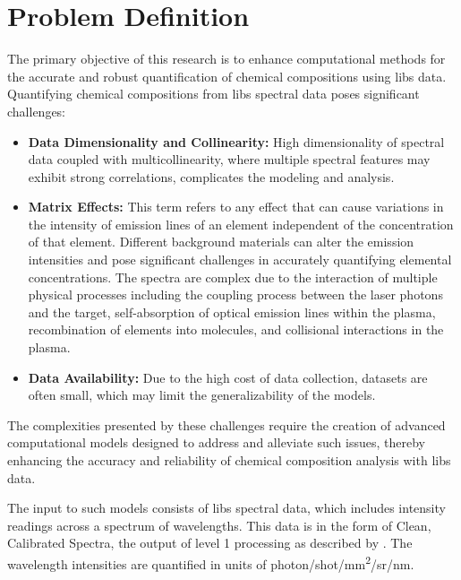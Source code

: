 \section{Problem Definition}\label{sec:problem_definition}
The primary objective of this research is to enhance computational methods for the accurate and robust quantification of chemical compositions using \gls{libs} data.
Quantifying chemical compositions from \gls{libs} spectral data poses significant challenges:
\begin{itemize}
    \item \textbf{Data Dimensionality and Collinearity:} High dimensionality of spectral data coupled with multicollinearity, where multiple spectral features may exhibit strong correlations, complicates the modeling and analysis\cite{andersonImprovedAccuracyQuantitative2017}.
    \item \textbf{Matrix Effects:} This term refers to any effect that can cause variations in the intensity of emission lines of an element independent of the concentration of that element. Different background materials can alter the emission intensities and pose significant challenges in accurately quantifying elemental concentrations. The spectra are complex due to the interaction of multiple physical processes including the coupling process between the laser photons and the target, self-absorption of optical emission lines within the plasma, recombination of elements into molecules, and collisional interactions in the plasma\cite{cleggRecalibrationMarsScience2017, andersonImprovedAccuracyQuantitative2017}.
    \item \textbf{Data Availability:} Due to the high cost of data collection, datasets are often small, which may limit the generalizability of the models\cite{p9_paper}.
\end{itemize}

The complexities presented by these challenges require the creation of advanced computational models designed to address and alleviate such issues, thereby enhancing the accuracy and reliability of chemical composition analysis with \gls{libs} data.

The input to such models consists of \gls{libs} spectral data, which includes intensity readings across a spectrum of wavelengths.
This data is in the form of Clean, Calibrated Spectra\cite{andersonImprovedAccuracyQuantitative2017}, the output of level 1 processing as described by \citet{wiensPreflightCalibrationInitial2013}.
The wavelength intensities are quantified in units of photon/shot/mm\textsuperscript{2}/sr/nm.

